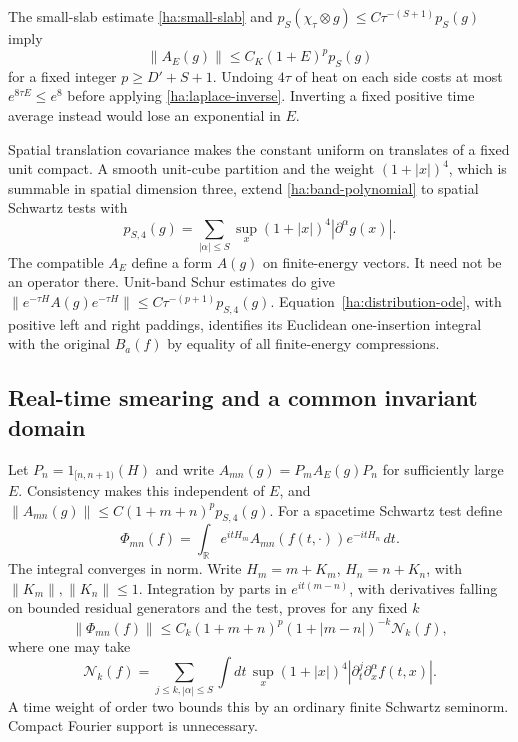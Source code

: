 The small-slab estimate \eqref{ha:small-slab} and
$p_S(\chi_\tau\otimes g)\leq C\tau^{-(S+1)}p_S(g)$ imply
\begin{equation}
 \|A_E(g)\|\leq C_K(1+E)^p p_S(g)
 \label{ha:band-polynomial}
\end{equation}
for a fixed integer $p\geq D'+S+1$.  Undoing $4\tau$ of heat on each
side costs at most $e^{8\tau E}\leq e^8$ before applying
\eqref{ha:laplace-inverse}.  Inverting a fixed positive time average
instead would lose an exponential in $E$.

Spatial translation covariance makes the constant uniform on translates
of a fixed unit compact.  A smooth unit-cube partition and the weight
$(1+|x|)^4$, which is summable in spatial dimension three, extend
\eqref{ha:band-polynomial} to spatial Schwartz tests with
\begin{equation}
 p_{S,4}(g)=\sum_{|\alpha|\leq S}
              \sup_x(1+|x|)^4|\partial^\alpha g(x)|.
 \label{ha:spatial-seminorm}
\end{equation}
The compatible $A_E$ define a form $A(g)$ on finite-energy vectors.
It need not be an operator there.  Unit-band Schur estimates do give
$\|e^{-\tau H}A(g)e^{-\tau H}\|
\leq C\tau^{-(p+1)}p_{S,4}(g)$.
Equation~\eqref{ha:distribution-ode}, with positive left and right
paddings, identifies its Euclidean one-insertion integral with the
original $B_a(f)$ by equality of all finite-energy compressions.

\subsection{Real-time smearing and a common invariant domain}

Let $P_n=1_{[n,n+1)}(H)$ and write
$A_{mn}(g)=P_mA_E(g)P_n$ for sufficiently large $E$.  Consistency makes
this independent of $E$, and
$\|A_{mn}(g)\|\leq C(1+m+n)^pp_{S,4}(g)$.
For a spacetime Schwartz test define
\begin{equation}
 \Phi_{mn}(f)=\int_{\mathbb R}
                e^{itH_m}A_{mn}(f(t,\cdot))e^{-itH_n}\,dt.
 \label{ha:real-smearing}
\end{equation}
The integral converges in norm.  Write $H_m=m+K_m$,
$H_n=n+K_n$, with $\|K_m\|,\|K_n\|\leq1$.  Integration by parts in
$e^{it(m-n)}$, with derivatives falling on bounded residual generators
and the test, proves for any fixed $k$
\begin{equation}
 \|\Phi_{mn}(f)\|\leq C_k(1+m+n)^p
                 (1+|m-n|)^{-k}\mathcal N_k(f),
 \label{ha:block-decay}
\end{equation}
where one may take
\begin{equation}
 \mathcal N_k(f)=\sum_{j\leq k,|\alpha|\leq S}
 \int dt\,\sup_x(1+|x|)^4
                   |\partial_t^j\partial_x^\alpha f(t,x)|.
 \label{ha:block-seminorm}
\end{equation}
A time weight of order two bounds this by an ordinary finite Schwartz
seminorm.  Compact Fourier support is unnecessary.

